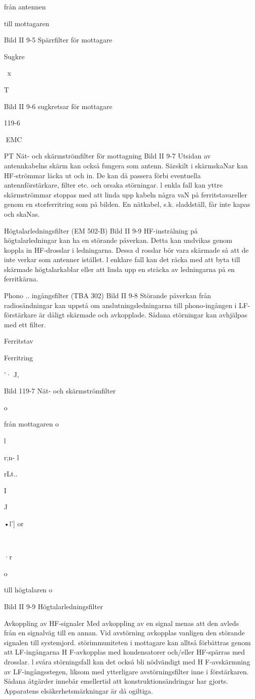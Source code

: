 från
antennen

till
mottagaren

Bild II 9-5 Spärrfilter för mottagare

Sugkre~

~x

T

Bild II 9-6 sugkretsar för mottagare

119-6

EMC

PT
Nät- och skärmströmfilter för mottagning
Bild II 9-7
Utsidan av antennkabelns skärm kan också
fungera som antenn. Särskilt i skärmskaNar
kan HF-strömmar läcka ut och in. De kan då
passera förbi eventuella antennförstärkare,
filter etc. och orsaka störningar.
l enkla fall kan yttre skärmströmmar stoppas med att linda upp kabeln några vaN på
ferritstavareller genom en storferritring som
på bilden. En nätkabel, s.k. sladdställ, får
inte kapas och skaNas.

Högtalarledningsfilter (EM 502-B)
Bild II 9-9
HF-instrålning på högtalarledningar kan ha
en störande påverkan. Detta kan undvikas
genom koppla in HF-drosslar i ledningarna.
Dessa d rosslar bör vara skärmade så att de
inte verkar som antenner istället.
l enklare fall kan det räcka med att byta till
skärmade högtalarkablar eller att linda upp
en sträcka av ledningarna på en ferritkärna.

Phono .. ingångsfilter (TBA 302)
Bild II 9-8
Störande påverkan från radiosändningar kan
uppstå om anslutningsledningarna till phono-ingången i LF-förstärkare är dåligt skärmade och avkopplade. Sådana störningar
kan avhjälpas med ett filter.

Ferritstav

Ferritring

'·
J,

Bild 119-7 Nät- och skärmströmfilter

o

från
mottagaren
o

l

r;n- l

rLt..

I

J

•l']
or

~

·r

o

till
högtalaren
o

Bild II 9-9 Högtalarledningsfilter

Avkoppling av HF-signaler
Med avkoppling av en signal menas att
den avleds från en signalväg till en
annan. Vid avstörning avkopplas vanligen den störande signalen till systemjord.
störimmuniteten i mottagare kan
alltså förbättras genom att LF-ingångarna H F-avkopplas med kondensatorer
och/eller HF-spärras med drosslar.
l svåra störningsfall kan det också
bli nödvändigt med H F-avskärmning av
LF-ingångsstegen, liksom med ytterligare avstörningsfilter inne i förstärkaren.
Sådana åtgärder innebär emellertid
att konstruktionsändringar har gjorts.
Apparatens elsäkerhetsmärkningar är
då ogiltiga.


